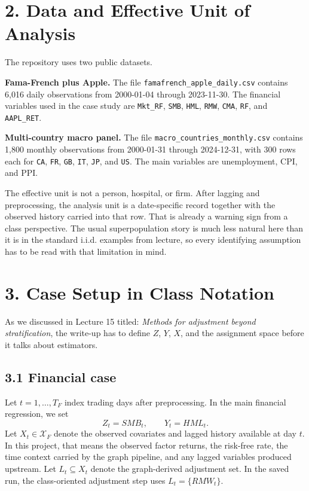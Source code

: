 \documentclass[12pt]{article}
\begin{document}
\section*{2. Data and Effective Unit of Analysis}

The repository uses two public datasets.

\textbf{Fama-French plus Apple.} The file \texttt{famafrench\_apple\_daily.csv} contains 6,016
daily observations from 2000-01-04 through 2023-11-30. The financial variables used in the case
study are \texttt{Mkt\_RF}, \texttt{SMB}, \texttt{HML}, \texttt{RMW}, \texttt{CMA}, \texttt{RF},
and \texttt{AAPL\_RET}.

\textbf{Multi-country macro panel.} The file \texttt{macro\_countries\_monthly.csv} contains 1,800
monthly observations from 2000-01-31 through 2024-12-31, with 300 rows each for \texttt{CA},
\texttt{FR}, \texttt{GB}, \texttt{IT}, \texttt{JP}, and \texttt{US}. The main variables are
unemployment, CPI, and PPI.

The effective unit is not a person, hospital, or firm. After lagging and preprocessing, the
analysis unit is a date-specific record together with the observed history carried into that row.
That is already a warning sign from a class perspective. The usual superpopulation story is much
less natural here than it is in the standard i.i.d. examples from lecture, so every identifying
assumption has to be read with that limitation in mind.

\section*{3. Case Setup in Class Notation}

As we discussed in Lecture 15 titled: \textit{Methods for adjustment beyond stratification}, the
write-up has to define \(Z\), \(Y\), \(X\), and the assignment space before it talks about
estimators.

\subsection*{3.1 Financial case}

Let \(t=1,\dots,T_F\) index trading days after preprocessing. In the main financial regression, we
set
\[
Z_t = SMB_t, \qquad Y_t = HML_t.
\]
Let \(X_t \in \mathcal{X}_F\) denote the observed covariates and lagged history available at day
\(t\). In this project, that means the observed factor returns, the risk-free rate, the time
context carried by the graph pipeline, and any lagged variables produced upstream. Let
\(L_t \subseteq X_t\) denote the graph-derived adjustment set. In the saved run, the class-oriented
adjustment step uses \(L_t = \{RMW_t\}\).
\end{document}
